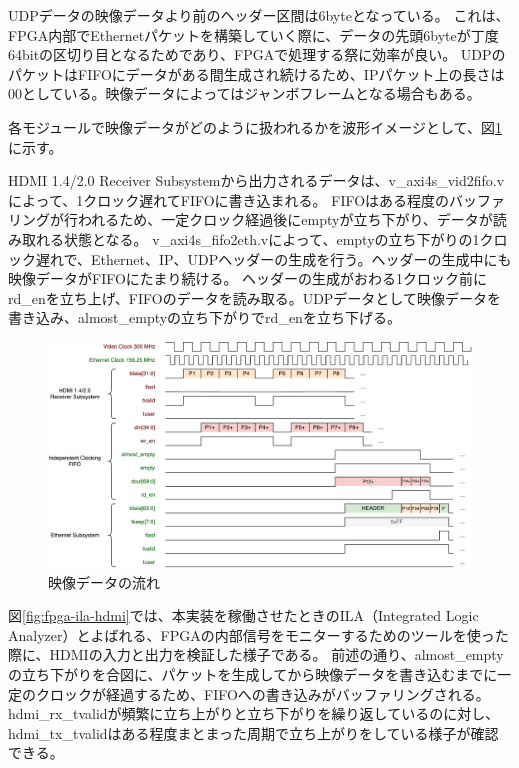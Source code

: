 UDPデータの映像データより前のヘッダー区間は6byteとなっている。
これは、FPGA内部でEthernetパケットを構築していく際に、データの先頭6byteが丁度64bitの区切り目となるためであり、FPGAで処理する祭に効率が良い。
UDPのパケットはFIFOにデータがある間生成され続けるため、IPパケット上の長さは00としている。映像データによってはジャンボフレームとなる場合もある。

各モジュールで映像データがどのように扱われるかを波形イメージとして、図\ref{fig:fpga-first-pixel-waveform}に示す。

HDMI 1.4/2.0 Receiver Subsystemから出力されるデータは、v\_axi4s\_vid2fifo.vによって、1クロック遅れてFIFOに書き込まれる。
FIFOはある程度のバッファリングが行われるため、一定クロック経過後にemptyが立ち下がり、データが読み取れる状態となる。
v\_axi4s\_fifo2eth.vによって、emptyの立ち下がりの1クロック遅れで、Ethernet、IP、UDPヘッダーの生成を行う。ヘッダーの生成中にも映像データがFIFOにたまり続ける。
ヘッダーの生成がおわる1クロック前にrd\_enを立ち上げ、FIFOのデータを読み取る。UDPデータとして映像データを書き込み、almost\_emptyの立ち下がりでrd\_enを立ち下げる。

\begin{figure}[htbp]
  \begin{center}
    \includegraphics[bb=0 0 942 502,width=22.5cm,angle=270]{img/fpga-first-pixel-waveform.pdf}
  \end{center}
  \caption{映像データの流れ}
  \label{fig:fpga-first-pixel-waveform}
\end{figure}

図\ref{fig:fpga-ila-hdmi}では、本実装を稼働させたときのILA（Integrated Logic Analyzer）とよばれる、FPGAの内部信号をモニターするためのツールを使った際に、HDMIの入力と出力を検証した様子である。
前述の通り、almost\_emptyの立ち下がりを合図に、パケットを生成してから映像データを書き込むまでに一定のクロックが経過するため、FIFOへの書き込みがバッファリングされる。
hdmi\_rx\_tvalidが頻繁に立ち上がりと立ち下がりを繰り返しているのに対し、hdmi\_tx\_tvalidはある程度まとまった周期で立ち上がりをしている様子が確認できる。

